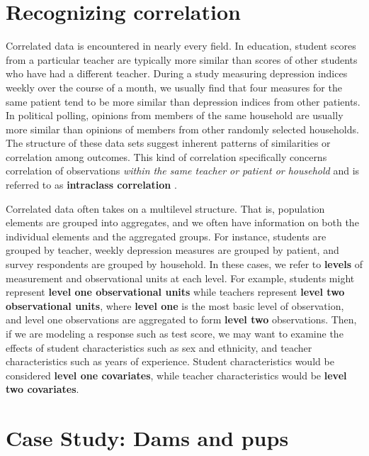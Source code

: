 \documentclass[
]{krantz}
\begin{document}
\hypertarget{recognizing-correlation}{%
\section{Recognizing correlation}\label{recognizing-correlation}}

Correlated data is encountered in nearly every field. In education, student scores from a particular teacher are typically more similar than scores of other students who have had a different teacher. During a study measuring depression indices weekly over the course of a month, we usually find that four measures for the same patient tend to be more similar than depression indices from other patients. In political polling, opinions from members of the same household are usually more similar than opinions of members from other randomly selected households. The structure of these data sets suggest inherent patterns of similarities or correlation among outcomes. This kind of correlation specifically concerns correlation of observations \emph{within the same teacher or patient or household} and is referred to as \textbf{intraclass correlation} .

Correlated data often takes on a multilevel structure. That is, population elements are grouped into aggregates, and we often have information on both the individual elements and the aggregated groups. For instance, students are grouped by teacher, weekly depression measures are grouped by patient, and survey respondents are grouped by household. In these cases, we refer to \textbf{levels}  of measurement and observational units at each level. For example, students might represent \textbf{level one observational units} while teachers represent \textbf{level two observational units}, where \textbf{level one} is the most basic level of observation, and level one observations are aggregated to form \textbf{level two} observations. Then, if we are modeling a response such as test score, we may want to examine the effects of student characteristics such as sex and ethnicity, and teacher characteristics such as years of experience. Student characteristics would be considered \textbf{level one covariates}, while teacher characteristics would be \textbf{level two covariates}.

\hypertarget{case-study-dams-and-pups}{%
\section{Case Study: Dams and pups}\label{case-study-dams-and-pups}}
\end{document}
